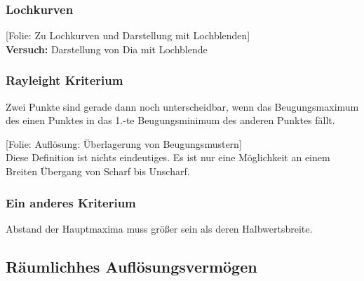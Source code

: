 \documentclass[titlepage,11pt,a4paper,ngerman]{report}
\newcommand{\folie}[1]{\color{gray}[Folie: #1]\color{black}}
\newcommand{\versuch}[1]{\color{red!50!black} \textbf{Versuch:} \color{black} #1\\ }
\newcommand{\lcom}[1]{\color{MidnightBlue}#1\color{black}}
\newcommand{\rbox}[1]{\begin{tcolorbox}[colback=white,colframe=red!75!black]#1\end{tcolorbox}}
\begin{document}
\subsubsection{Lochkurven}

\folie{Zu Lochkurven und Darstellung mit Lochblenden}\\
\versuch{Darstellung von Dia mit Lochblende}

\subsubsection{Rayleight Kriterium}

\rbox{Zwei Punkte sind gerade dann noch unterscheidbar, wenn das Beugungsmaximum des einen Punktes in das 1.-te Beugungsminimum des anderen Punktes fällt.}
\noindent
\folie{Auflösung: Überlagerung von Beugungsmustern}\\
\lcom{Diese Definition ist nichts eindeutiges. Es ist nur eine Möglichkeit an einem Breiten Übergang von Scharf bis Unscharf.}

\subsubsection{Ein anderes Kriterium}
Abstand der Hauptmaxima muss größer sein als deren Halbwertsbreite.



\subsection{Räumlichhes Auflösungsvermögen}
\end{document}
